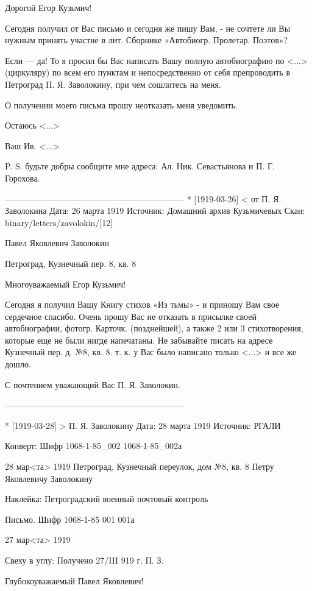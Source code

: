 Дорогой Егор Кузьмич!

Сегодня получил от Вас письмо и сегодня же пишу Вам, - не сочтете ли Вы нужным принять участие в лит. Сборнике «Автобиогр. Пролетар. Поэтов»?

Если — да! То я просил бы Вас написать Вашу полную автобиографию по <...> (циркуляру) по всем его пунктам и непосредственно от себя препроводить в Петроград П. Я. Заволокину, при чем сошлитесь на меня.

О получении моего письма прошу неотказать меня уведомить.

Остаюсь <...>

Ваш Ив. <...>

P. S. будьте добры сообщите мне адреса: Ал. Ник. Севастьянова и П. Г. Горохова.

---------------------------------------------------------------
* [1919-03-26] < от П. Я. Заволокина 
Дата: 26 марта 1919
Источник: Домашний архив Кузьмичевых
Скан: binary/letters/zavolokin/[12]

Павел Яковлевич Заволокин

Петроград, Кузнечный пер. 8, кв. 8

Многоуважаемый Егор Кузьмич!

Сегодня я получил Вашу Книгу стихов «Из тьмы» - и приношу Вам свое сердечное спасибо. Очень прошу Вас не отказать в присылке своей автобиографии, фотогр. Карточк. (позднейшей), а также 2 или 3 стихотворения, которые еще не были нигде напечатаны. Не забывайте писать на адресе Кузнечный пер. д. №8, кв. 8. т. к. у Вас было написано только <...> и все же дошло.

С почтением уважающий Вас П. Я. Заволокин. 

---------------------------------------------------------------


* [1919-03-28] > П. Я. Заволокину 
Дата: 28 марта 1919
Источник: РГАЛИ

Конверт:
Шифр    1068-1-85_002
        1068-1-85_002а

28 мар<та> 1919
Петроград, Кузнечный переулок, дом №8, кв. 8
Петру Яковлевичу Заволокину

Наклейка: Петроградский военный почтовый контроль

Письмо.
Шифр 1068-1-85  001
                001а

                
27 мар<та> 1919

Свеху в углу: Получено 27/III 919 г. П. З.

Глубокоуважаемый Павел Яковлевич!

